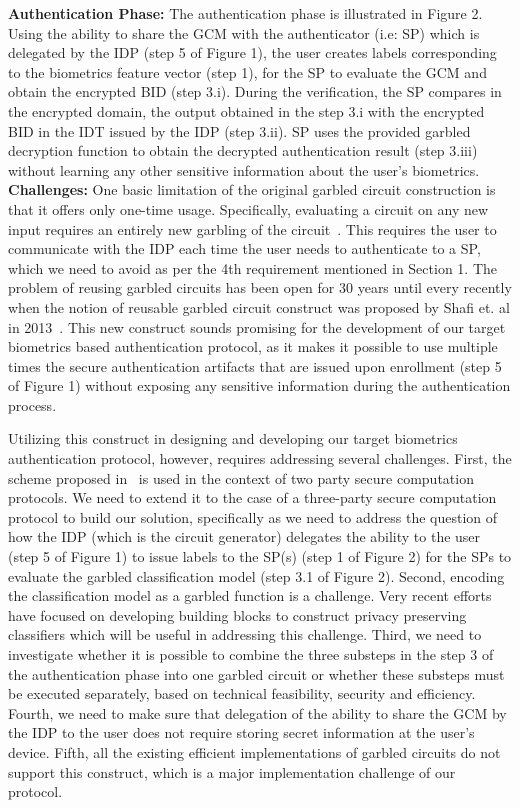 \documentclass[10pt]{article}
\begin{document}
\textbf{Authentication Phase:}
The authentication phase is illustrated in Figure 2. Using the ability to share the GCM with the authenticator (i.e: SP) which is delegated by the IDP 
(step 5 of Figure 1), the user creates labels corresponding to the biometrics feature vector (step 1), for the SP to evaluate the GCM and obtain the 
encrypted BID (step 3.i).
During the verification, the SP compares in the encrypted domain, the output obtained in the step 3.i with the encrypted BID in the IDT issued by the 
IDP (step 3.ii). SP uses the provided garbled decryption function to obtain the decrypted authentication result (step 3.iii) without learning any 
other sensitive information about the user's biometrics.\\

\textbf{Challenges:}
One basic limitation of the original garbled circuit construction is that it offers only one-time usage. Specifically, evaluating a circuit on any 
new input requires an entirely new garbling of the circuit~\cite{reusablegc}. This requires the user to communicate with the IDP each time the user 
needs to authenticate to a SP, which we need to avoid as per the 4th requirement mentioned in Section 1. The problem of reusing garbled 
circuits has been open for 30 years until every recently when the notion of reusable garbled circuit construct was proposed by Shafi et. al in 2013~\cite{reusablegc}. This new 
construct sounds promising for the development of our target biometrics based authentication protocol, as it makes it possible to use multiple times the secure authentication 
artifacts that are issued upon enrollment (step 5 of Figure 1) without exposing any sensitive information during the authentication  
process.

Utilizing this construct in designing and developing our target biometrics authentication protocol, however, requires addressing several challenges. 
First, the scheme proposed in~\cite{reusablegc} is used in the context of two party secure computation protocols. We need to extend it to the case of a three-party 
secure computation protocol to build our solution, specifically as we need to address the question of how the IDP (which is the circuit generator) 
delegates the ability to the user (step 5 of Figure 1) to issue labels  to the SP(s) (step 1 of Figure 2) for the SPs to evaluate the garbled 
classification model (step 3.1 of Figure 2). 
Second, encoding the classification model as a garbled function is a challenge. Very recent 
efforts~\cite{mlgc} have focused on developing building 
blocks to construct privacy preserving classifiers which will be useful in addressing this challenge.
Third, we need to investigate whether it is possible to combine the three substeps in the step 3 of the authentication phase into one garbled 
circuit or whether these substeps must be executed separately, based on technical feasibility, security and efficiency.
Fourth, we need to make sure that delegation of the ability to share the GCM by the IDP to the user does not require storing secret information at 
the user's device.
Fifth, all the existing efficient implementations of garbled circuits do not support this construct, which is a  major implementation challenge of our 
protocol.
\end{document}
